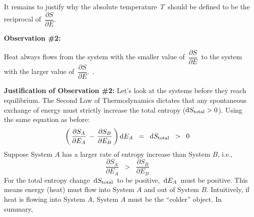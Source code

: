 \vskip 0.4cm
\noindent
It remains to justify why
the absolute temperature \,$T$\, should be defined to be
the reciprocal of \,$\dfrac{\partial S}{\partial E}$.\,

\vskip 0.6cm
\begin{center}
\begin{minipage}{4.5in}
\begin{tcolorbox}[arc=8px, colback=white, colframe=black]
\begin{center}
\vskip 0.1cm
\textbf{Observation \#2:}
\end{center}
\vskip -0.1cm
Heat always flows from the system with the smaller value of
\,$\dfrac{\partial S}{\partial E}$\,
to the system with the larger value of
\,$\dfrac{\partial S}{\partial E}$.\,
\vskip -0.2cm
{\color{white}.}
\end{tcolorbox}
\end{minipage}
\end{center}
\vskip 0.2cm
\noindent
\textbf{Justification of Observation \#2:}
\vskip 0.1cm
\noindent
Let's look at the systems before they reach equilibrium.
The Second Law of Thermodynamics dictates that
any spontaneous exchange of energy must strictly increase
the total entropy ($\textnormal{d} S_{\textnormal{total}} > 0$).
Using the same equation as before:
\begin{equation*}
\left(\,
    \dfrac{\partial S_{A}}{\partial E_{A}}
    \, - \,
    \dfrac{\partial S_{B}}{\partial E_{B}}
    \,\right)
\textnormal{d} E_{A}
\;\; = \;\;
    \textnormal{d} S_{\textnormal{total}}
\;\; > \;\;
    0
\end{equation*}
Suppose System $A$ has a larger rate of entropy increase than System $B$, i.e.,
\begin{equation*}
\dfrac{\partial S_{A}}{\partial E_{A}}
\;\; > \;\;
    \dfrac{\partial S_{B}}{\partial E_{B}}
\end{equation*}
For the total entropy change \,$\textnormal{d} S_{\textnormal{total}}$\, to be positive,
\,$\textnormal{d} E_{A}$\, must be positive.
This means energy (heat) must flow into System $A$ and out of System $B$.
Intuitively, if heat is flowing into System $A$,
System $A$ must be the ``colder'' object.
In summary,
